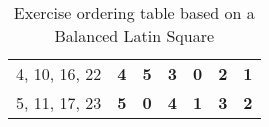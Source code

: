 \begin{table}[]
{\begin{tabular}{rcccccc}
\multicolumn{1}{r|}{4, 10, 16, 22} & \multicolumn{1}{c|}{\textbf{4}} & \multicolumn{1}{c|}{\textbf{5}} & \multicolumn{1}{c|}{\textbf{3}} & \multicolumn{1}{c|}{\textbf{0}} & \multicolumn{1}{c|}{\textbf{2}} & \multicolumn{1}{c|}{\textbf{1}} \\ \cline{2-7} 
\multicolumn{1}{r|}{5, 11, 17, 23} & \multicolumn{1}{c|}{\textbf{5}} & \multicolumn{1}{c|}{\textbf{0}} & \multicolumn{1}{c|}{\textbf{4}} & \multicolumn{1}{c|}{\textbf{1}} & \multicolumn{1}{c|}{\textbf{3}} & \multicolumn{1}{c|}{\textbf{2}} \\ \cline{2-7} 
\end{tabular}%
}
\caption{Exercise ordering table based on a Balanced Latin Square}
\label{my-label}
\end{table}






